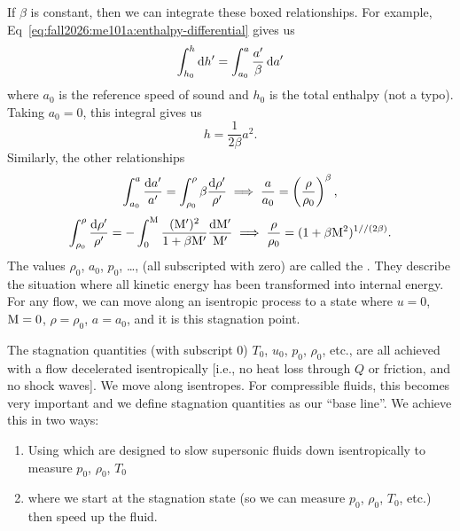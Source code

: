\begin{node}
If $\beta$ is constant, then we can integrate these boxed
relationships. For example, Eq~\eqref{eq:fall2026:me101a:enthalpy-differential}
gives us
\begin{equation}
\int^{h}_{h_{0}}\mathrm{d} h'=\int^{a}_{a_{0}}\frac{a'}{\beta}\,\mathrm{d} a'
\end{equation}
where $a_{0}$ is the reference speed of sound and $h_{0}$ is the total
enthalpy (not a typo). Taking $a_{0}=0$, this integral gives us
\begin{equation}
\boxed{h = \frac{1}{2\beta}a^{2}.}
\end{equation}
Similarly, the other relationships
\begin{equation}
\int^{a}_{a_{0}}\frac{\mathrm{d} a'}{a'}=\int^{\rho}_{\rho_{0}}\beta\frac{\mathrm{d}\rho'}{\rho'}\implies
\frac{a}{a_{0}}=\left(\frac{\rho}{\rho_{0}}\right)^{\beta},
\end{equation}
\begin{equation}
\int^{\rho}_{\rho_{0}}\frac{\mathrm{d}\rho'}{\rho'}=-\int^{\mathrm{M}}_{0}\frac{(\mathrm{M}')^{2}}{1+\beta\mathrm{M}'}\frac{\mathrm{d}\mathrm{M}'}{\mathrm{M}'}\implies\frac{\rho}{\rho_{0}}=(1+\beta\mathrm{M}^{2})^{1//(2\beta)}.
\end{equation}
The values $\rho_{0}$, $a_{0}$, $p_{0}$, \dots, (all subscripted with
zero) are called the . They describe the
situation where all kinetic energy has been transformed into internal
energy. For any flow, we can move along an isentropic process to a
state where $u=0$, $\mathrm{M}=0$, $\rho=\rho_{0}$, $a=a_{0}$, and it is
this stagnation point.
\end{node}

\begin{aside}
The stagnation quantities (with subscript 0) $T_{0}$, $u_{0}$,
$p_{0}$, $\rho_{0}$, etc., are all achieved with a flow decelerated
isentropically [i.e., no heat loss through $Q$ or friction, and no
  shock waves].
We move along isentropes. For compressible fluids, this becomes very
important and we define stagnation quantities as our ``base line''. We
achieve this in two ways:
\begin{enumerate}
\item Using  which are designed to slow supersonic
  fluids down isentropically to measure $p_{0}$, $\rho_{0}$, $T_{0}$
\item {} where we start at the stagnation
  state (so we can measure $p_{0}$, $\rho_{0}$, $T_{0}$, etc.) then
  speed up the fluid.
\end{enumerate}
\end{aside}

